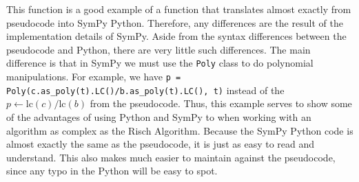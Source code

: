 This function is a good example of a function that translates almost
exactly from pseudocode into SymPy Python.  Therefore, any differences
are the result of the implementation details of SymPy.  Aside from the
syntax differences between the pseudocode and Python, there are very
little such differences.  The main difference is that in SymPy we must
use the \texttt{Poly} class to do polynomial manipulations.  For
example, we have {\tt p = Poly(c.as\_poly(t).LC()/b.as\_poly(t).LC(),
t)} instead of the $p \leftarrow \mathrm{lc}(c)/\mathrm{lc}(b)$ from the
pseudocode.  Thus, this example serves to show some of the advantages of
using Python and SymPy to when working with an algorithm as complex as
the Risch Algorithm.  Because the SymPy Python code is almost exactly
the same as the pseudocode, it is just as easy to read and understand.
This also makes much easier to maintain against the pseudocode, since
any typo in the Python will be easy to spot.
